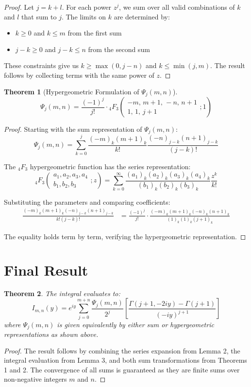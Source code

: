 \documentclass[12pt]{article}
\newtheorem{theorem}{Theorem}
\begin{document}
\begin{proof}
Let $j = k + l$. For each power $z^j$, we sum over all valid combinations of $k$ and $l$ that sum to $j$. The limits on $k$ are determined by:
\begin{itemize}
\item $k \geq 0$ and $k \leq m$ from the first sum
\item $j-k \geq 0$ and $j-k \leq n$ from the second sum
\end{itemize}
These constraints give us $k \geq \max(0,j-n)$ and $k \leq \min(j,m)$. The result follows by collecting terms with the same power of $z$.
\end{proof}

\begin{theorem}[Hypergeometric Formulation of $\Psi_j(m,n)$]
\[
\Psi_j(m,n) = \frac{(-1)^j}{j!} \cdot {}_4F_3\left(
\begin{matrix}
- m, \, m+1, \, -n, \, n+1 \\
1, \, 1, \, j+1
\end{matrix}; 1 \right)
\]
\end{theorem}

\begin{proof}
Starting with the sum representation of $\Psi_j(m,n)$:
\[
\Psi_j(m,n) = \sum_{k=0}^j \frac{(-m)_k (m+1)_k}{k!} \frac{(-n)_{j-k} (n+1)_{j-k}}{(j-k)!}
\]

The ${}_4F_3$ hypergeometric function has the series representation:
\[
{}_4F_3\left(\begin{matrix}
a_1, a_2, a_3, a_4 \\
b_1, b_2, b_3
\end{matrix}; z\right) = \sum_{k=0}^\infty 
\frac{(a_1)_k(a_2)_k(a_3)_k(a_4)_k}{(b_1)_k(b_2)_k(b_3)_k} \frac{z^k}{k!}
\]

Substituting the parameters and comparing coefficients:
\begin{align*}
\frac{(-m)_k(m+1)_k(-n)_{j-k}(n+1)_{j-k}}{k!(j-k)!} &= 
\frac{(-1)^j}{j!} \cdot \frac{(-m)_k(m+1)_k(-n)_k(n+1)_k}{(1)_k(1)_k(j+1)_k}
\end{align*}

The equality holds term by term, verifying the hypergeometric representation.
\end{proof}

\section*{Final Result}

\begin{theorem}
The integral evaluates to:
\[
I_{m,n}(y) = e^{iy} \sum_{j=0}^{m+n} \frac{\Psi_j(m,n)}{2^j} 
\left[\frac{\Gamma(j+1,-2iy)-\Gamma(j+1)}{(-iy)^{j+1}}\right]
\]
where $\Psi_j(m,n)$ is given equivalently by either sum or hypergeometric representations as shown above.
\end{theorem}

\begin{proof}
The result follows by combining the series expansion from Lemma 2, the integral evaluation from Lemma 3, and both sum transformations from Theorems 1 and 2. The convergence of all sums is guaranteed as they are finite sums over non-negative integers $m$ and $n$.
\end{proof}
\end{document}

